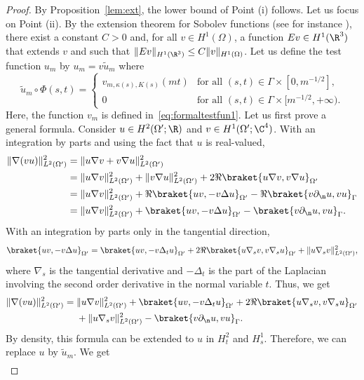 \begin{proof}
By Proposition~\ref{lem:ext}, the lower bound of Point (i) follows. Let us focus on Point (ii).
By the extension theorem for Sobolev functions (see for instance \cite[\S5.4]{evans1998partial}), there exist a constant $C>0$ and, for all $v\in H^1(\Omega)$, a function $Ev\in H^1(\R^3)$ that extends $v$ and such that $\|Ev\|_{H^1(\R^3)}\leq C\|v\|_{H^1(\Omega)}$.
Let us define the test function $u_m$ by $u_m=v\widetilde u_m$ where
\[\widetilde u_m\circ\Phi(s,t)=\begin{cases}v_{m,\kappa(s),K(s)}(mt)&\text{for all }(s,t)\in\Gamma\times[0,m^{-1/2}],\\0&\text{for all }(s,t)\in\Gamma\times[m^{-1/2},+\infty).\end{cases}\]
Here, the function $v_m$ is defined in~\eqref{eq:formaltestfun1}.
Let us first prove a general formula. Consider $u\in H^2(\Omega';\R)$ and $v\in H^1(\Omega';\C^4)$. With an integration by parts and using the fact that $u$ is real-valued,
\[\begin{aligned}
\|\nabla(vu)\|_{L^2(\Omega')}^2&=\|u\nabla v+v\nabla u\|_{L^2(\Omega')}^2\\
&=\|u\nabla v\|_{L^2(\Omega')}^2+\|v\nabla u\|_{L^2(\Omega')}^2+2\Re\braket{u\nabla v,v\nabla u}_{\Omega'}\\
&=\|u\nabla v\|_{L^2(\Omega')}^2+\Re\braket{uv,-v\Delta u}_{\Omega'}-\Re\braket{v\partial_\n u,vu}_\Gamma\\
&=\|u\nabla v\|_{L^2(\Omega')}^2+\braket{uv,-v\Delta u}_{\Omega'}-\braket{v\partial_\n u,vu}_\Gamma.
\end{aligned}\]
With an integration by parts only in the tangential direction,
\[\braket{uv,-v\Delta u}_{\Omega'}=\braket{uv,-v\Delta_tu}_{\Omega'}+2\Re\braket{u\nabla_sv,v\nabla_su}_{\Omega'}+\|u\nabla_sv\|_{L^2(\Omega')}^2,\]
where $\nabla_s$ is the tangential derivative and $-\Delta_t$ is the part of the Laplacian involving the second order derivative in the normal variable $t$. Thus, we get
\[\begin{aligned}
\|\nabla(vu)\|_{L^2(\Omega')}^2={}&\|u\nabla v\|_{L^2(\Omega')}^2+\braket{uv,-v\Delta_tu}_{\Omega'}+2\Re\braket{u\nabla_sv,v\nabla_su}_{\Omega'}\\&+\|u\nabla_sv\|_{L^2(\Omega')}^2-\braket{v\partial_\n u,vu}_\Gamma.
\end{aligned}\]
By density, this formula can be extended to $u$ in $H_t^2$ and $H_s^1$. Therefore, we can replace $u$ by $\widetilde u_m$. We get
\begin{equation}\label{pub:2.19}\begin{aligned}

\end{aligned}
\end{equation}
\end{proof}
